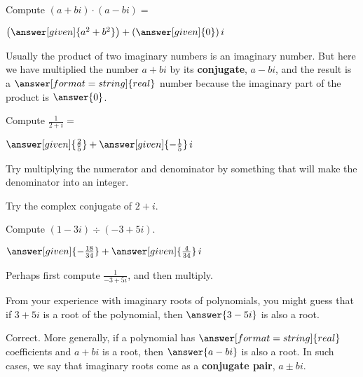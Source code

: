 \documentclass[nooutcomes]{ximera}
\begin{document}
\begin{problem}
Compute $(a+bi) \cdot (a-bi)=$
\begin{prompt}
	$\left(\answer[given]{a^2+b^2}\right) + \left(\answer[given]{0}\right)i$
\end{prompt}
\begin{problem}
Usually the product of two imaginary numbers is an imaginary number.  But here we have multiplied the number $a+bi$ by its
\textbf{conjugate}, $a-bi$, and the result is a $\answer[format=string]{real}$ number because the imaginary part of the product is $\answer{0}$.   
\end{problem}
\end{problem}


\begin{problem}
Compute $\frac{1}{2+i} = $
\begin{prompt}
	$\answer[given]{\frac{2}{5}} + \answer[given]{-\frac{1}{5}}\,i$
\end{prompt}
\begin{hint}
Try multiplying the numerator and denominator by something that will make the denominator into an integer.  
\end{hint}
\begin{hint}
Try the complex conjugate of $2+i$.
\end{hint}
\end{problem}



\begin{problem}
Compute $(1-3i) \div (-3+5i)$.
\begin{prompt}
	$\answer[given]{-\frac{18}{34}} + \answer[given]{\frac{4}{34}}\,i$
\end{prompt}
\begin{hint}
Perhaps first compute $\frac{1}{-3+5i}$, and then multiply.
\end{hint}
\end{problem}

\begin{problem}
From your experience with imaginary roots of polynomials, you might guess that if $3+5i$ is a root of the polynomial, then $\answer{3-5i}$ is also a root.    
\begin{problem}
Correct.  More generally, if a polynomial has $\answer[format=string]{real}$ coefficients and $a+bi$ is a root, then $\answer{a-bi}$ is also a root.  In such cases, we say that imaginary roots come as a \textbf{conjugate pair}, $a\pm bi$.  

\end{problem}
\end{problem}
\end{document}
